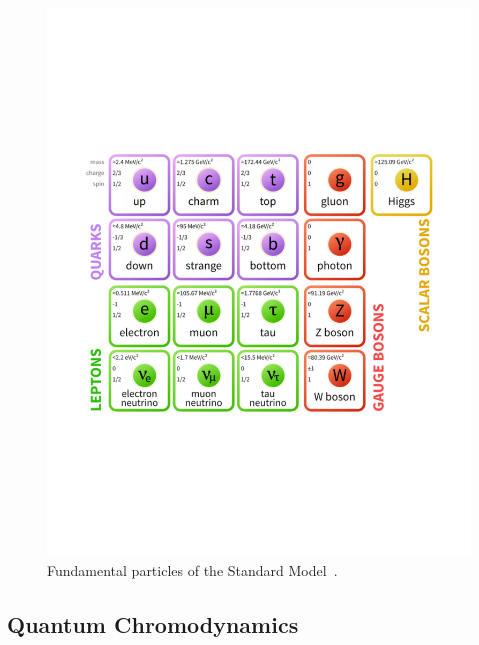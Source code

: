 \begin{figure}[htb]
\centering
\includegraphics[width=1.0\textwidth]{smdiagram.pdf}
\caption{Fundamental particles of the Standard Model~\cite{modellinginvisible}.}
\label{fig:SM}
\end{figure}






\subsection{Quantum Chromodynamics}\label{secSM:ch1}

